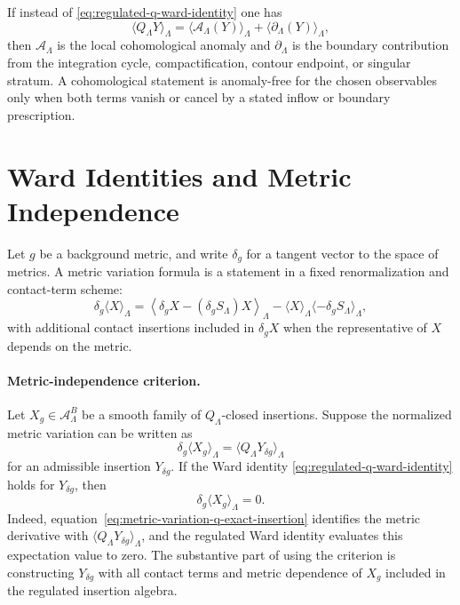 \begin{definition}
\label{def:cohomological-anomaly-boundary}
If instead of \eqref{eq:regulated-q-ward-identity} one has
\[
  \langle Q_\Lambda Y\rangle_\Lambda
  =
  \langle \mathcal A_\Lambda(Y)\rangle_\Lambda
  +
  \langle \partial_\Lambda(Y)\rangle_\Lambda,
\]
then \(\mathcal A_\Lambda\) is the local cohomological anomaly and
\(\partial_\Lambda\) is the boundary contribution from the integration
cycle, compactification, contour endpoint, or singular stratum.  A
cohomological statement is anomaly-free for the chosen observables only when
both terms vanish or cancel by a stated inflow or boundary prescription.
\end{definition}

\section{Ward Identities and Metric Independence}

Let \(g\) be a background metric, and write
\(\delta_g\) for a tangent vector to the space of metrics.  A metric
variation formula is a statement in a fixed renormalization and contact-term
scheme:
\begin{equation}
  \delta_g\langle X\rangle_\Lambda
  =
  \left\langle
    \delta_g X-(\delta_g S_\Lambda)X
  \right\rangle_\Lambda
  -
  \langle X\rangle_\Lambda\langle-\delta_gS_\Lambda\rangle_\Lambda,
  \label{eq:cohomological-normalized-metric-variation}
\end{equation}
with additional contact insertions included in \(\delta_gX\) when the
representative of \(X\) depends on the metric.

\paragraph{Metric-independence criterion.}
Let \(X_g\in\mathcal A_\Lambda^B\) be a smooth family of
\(Q_\Lambda\)-closed insertions.  Suppose the normalized metric variation can
be written as
\begin{equation}
  \delta_g\langle X_g\rangle_\Lambda
  =
  \langle Q_\Lambda Y_{\delta g}\rangle_\Lambda
  \label{eq:metric-variation-q-exact-insertion}
\end{equation}
for an admissible insertion \(Y_{\delta g}\).  If the Ward identity
\eqref{eq:regulated-q-ward-identity} holds for \(Y_{\delta g}\), then
\[
  \delta_g\langle X_g\rangle_\Lambda=0.
\]
Indeed, equation~\eqref{eq:metric-variation-q-exact-insertion} identifies the
metric derivative with \(\langle Q_\Lambda Y_{\delta g}\rangle_\Lambda\), and
the regulated Ward identity evaluates this expectation value to zero.  The
substantive part of using the criterion is constructing \(Y_{\delta g}\) with
all contact terms and metric dependence of \(X_g\) included in the regulated
insertion algebra.


